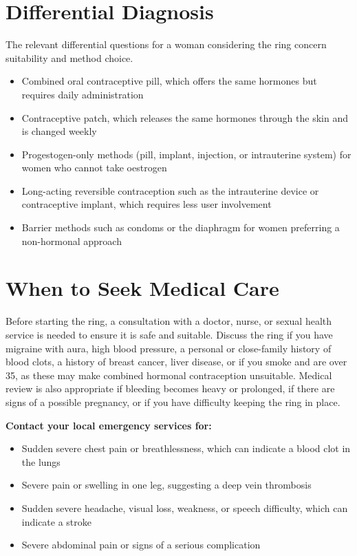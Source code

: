\section*{Differential Diagnosis}
The relevant differential questions for a woman considering the ring concern suitability and method choice.

\begin{itemize}
    \item Combined oral contraceptive pill, which offers the same hormones but requires daily administration
    \item Contraceptive patch, which releases the same hormones through the skin and is changed weekly
    \item Progestogen-only methods (pill, implant, injection, or intrauterine system) for women who cannot take oestrogen
    \item Long-acting reversible contraception such as the intrauterine device or contraceptive implant, which requires less user involvement
    \item Barrier methods such as condoms or the diaphragm for women preferring a non-hormonal approach
\end{itemize}

\section*{When to Seek Medical Care}
Before starting the ring, a consultation with a doctor, nurse, or sexual health service is needed to ensure it is safe and suitable. Discuss the ring if you have migraine with aura, high blood pressure, a personal or close-family history of blood clots, a history of breast cancer, liver disease, or if you smoke and are over 35, as these may make combined hormonal contraception unsuitable. Medical review is also appropriate if bleeding becomes heavy or prolonged, if there are signs of a possible pregnancy, or if you have difficulty keeping the ring in place.

\textbf{Contact your local emergency services for:}
\begin{itemize}
    \item Sudden severe chest pain or breathlessness, which can indicate a blood clot in the lungs
    \item Severe pain or swelling in one leg, suggesting a deep vein thrombosis
    \item Sudden severe headache, visual loss, weakness, or speech difficulty, which can indicate a stroke
    \item Severe abdominal pain or signs of a serious complication
\end{itemize}

